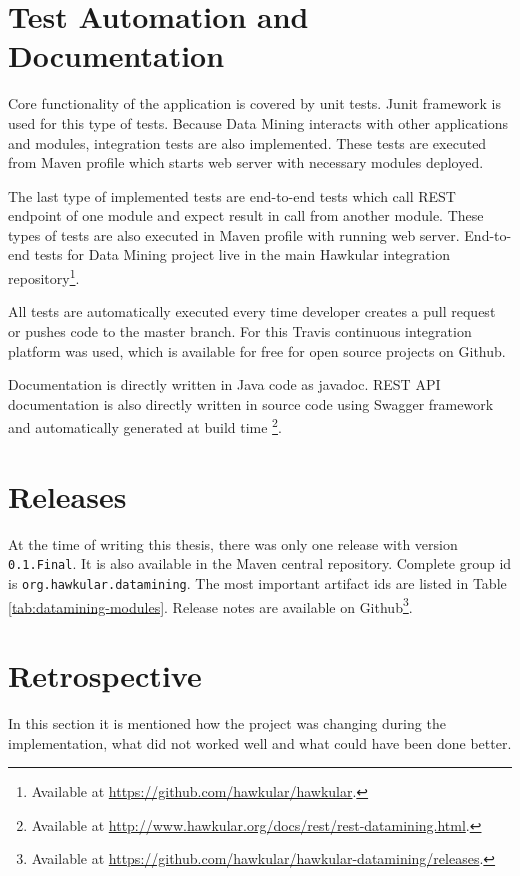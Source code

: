     \section{Test Automation and Documentation}
    Core functionality of the application is covered by unit tests. Junit framework is used for this type of tests.
    Because Data Mining interacts with other applications and modules, integration tests are also implemented. These
    tests are executed from Maven profile which starts web server with necessary modules deployed.

    The last type of implemented tests are end-to-end tests which call REST endpoint of one module and expect result
    in call from another module. These types of tests are also executed in Maven profile with running web server.
    End-to-end tests for Data Mining project live in the main Hawkular integration repository\footnote{
    Available at \url{https://github.com/hawkular/hawkular}.}.

    All tests are automatically executed every time developer creates a pull request or pushes code to the master
    branch. For this Travis continuous integration platform was used, which is available for free for open source
    projects on Github.

    Documentation is directly written in Java code as javadoc. REST API documentation is also directly
    written in source code using Swagger framework and automatically generated at build time
    \footnote{Available at \url{http://www.hawkular.org/docs/rest/rest-datamining.html}.}.

    \section{Releases}
    At the time of writing this thesis, there was only one release with version \texttt{0.1.Final}. It is also available
    in the Maven central repository. Complete group id is \texttt{org.hawkular.datamining}. The most important
    artifact ids are listed in Table \ref{tab:datamining-modules}. Release notes are available on
    Github\footnote{Available at \url{https://github.com/hawkular/hawkular-datamining/releases}.}.

    \section{Retrospective}
    In this section it is mentioned how the project was changing during the implementation, what did not worked well and
    what could have been done better.

